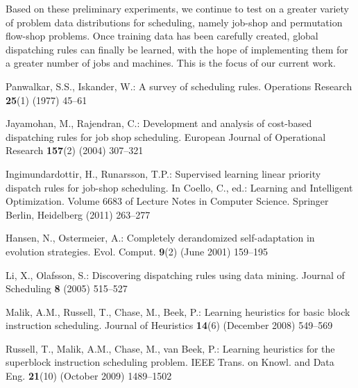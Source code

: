 \documentclass[smallextended]{llncs}
\begin{document}
Based on these preliminary experiments, we continue to test on a greater variety of problem data distributions for 
scheduling, namely job-shop and permutation flow-shop problems. Once training data has been carefully created, global 
dispatching rules can finally be learned, with the hope of implementing them for a greater number of jobs and 
machines. This is the focus of our current work.


 
\begin{thebibliography}{10}

Panwalkar, S.S., Iskander, W.:
\newblock A survey of scheduling rules.
\newblock Operations Research \textbf{25}(1) (1977)  45--61

Jayamohan, M., Rajendran, C.:
\newblock Development and analysis of cost-based dispatching rules for job shop
  scheduling.
\newblock European Journal of Operational Research \textbf{157}(2) (2004)
  307--321

Ingimundardottir, H., Runarsson, T.P.:
\newblock Supervised learning linear priority dispatch rules for job-shop
  scheduling.
\newblock In Coello, C., ed.: Learning and Intelligent Optimization. Volume
  6683 of Lecture Notes in Computer Science.
\newblock Springer Berlin, Heidelberg (2011)  263--277

Hansen, N., Ostermeier, A.:
\newblock Completely derandomized self-adaptation in evolution strategies.
\newblock Evol. Comput. \textbf{9}(2) (June 2001)  159--195

Li, X., Olafsson, S.:
\newblock Discovering dispatching rules using data mining.
\newblock Journal of Scheduling \textbf{8} (2005)  515--527

Malik, A.M., Russell, T., Chase, M., Beek, P.:
\newblock Learning heuristics for basic block instruction scheduling.
\newblock Journal of Heuristics \textbf{14}(6) (December 2008)  549--569

Russell, T., Malik, A.M., Chase, M., van Beek, P.:
\newblock Learning heuristics for the superblock instruction scheduling
  problem.
\newblock IEEE Trans. on Knowl. and Data Eng. \textbf{21}(10) (October 2009)
  1489--1502


\end{thebibliography}
\end{document}
